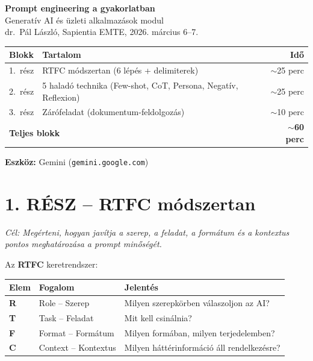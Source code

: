 \documentclass[11pt,a4paper]{article}
\begin{document}
\thispagestyle{empty}
\begin{center}
  {\LARGE\bfseries Prompt engineering a gyakorlatban}\\[5pt]
  {\normalsize Generatív AI és üzleti alkalmazások modul}\\[1pt]
  {\small\color{medgray} dr.\ Pál László, Sapientia EMTE, 2026. március 6--7.}
\end{center}

\vspace{10pt}
\noindent
\begin{tabularx}{\linewidth}{lXr}
\toprule
\textbf{Blokk} & \textbf{Tartalom} & \textbf{Idő} \\
\midrule
1.\ rész & RTFC módszertan (6 lépés + delimiterek) & $\sim$25 perc \\
2.\ rész & 5 haladó technika (Few-shot, CoT, Persona, Negatív, Reflexion) & $\sim$25 perc \\
3.\ rész & Zárófeladat (dokumentum-feldolgozás) & $\sim$10 perc \\
\midrule
\multicolumn{2}{l}{\textbf{Teljes blokk}} & \textbf{$\sim$60 perc} \\
\bottomrule
\end{tabularx}

\smallskip
\noindent\textbf{Eszköz:} Gemini (\texttt{gemini.google.com})

\vspace{8pt}

\section{1. RÉSZ -- RTFC módszertan}

\noindent\textit{Cél: Megérteni, hogyan javítja a szerep, a feladat, a formátum és a kontextus pontos meghatározása a prompt minőségét.}

\bigskip
\noindent Az \textbf{RTFC} keretrendszer:
\smallskip

\begin{tabularx}{\linewidth}{@{}llX@{}}
\toprule
\textbf{Elem} & \textbf{Fogalom} & \textbf{Jelentés} \\
\midrule
\textbf{R} & Role -- Szerep    & Milyen szerepkörben válaszoljon az AI? \\
\textbf{T} & Task -- Feladat   & Mit kell csinálnia? \\
\textbf{F} & Format -- Formátum & Milyen formában, milyen terjedelemben? \\
\textbf{C} & Context -- Kontextus & Milyen háttérinformáció áll rendelkezésre? \\
\bottomrule
\end{tabularx}
\end{document}
